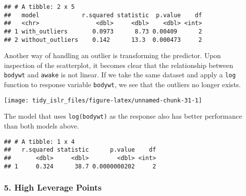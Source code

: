 \documentclass[]{book}
\newenvironment{Shaded}{\begin{snugshade}}{\end{snugshade}}
\newcommand{\DataTypeTok}[1]{\textcolor[rgb]{0.13,0.29,0.53}{#1}}
\newcommand{\KeywordTok}[1]{\textcolor[rgb]{0.13,0.29,0.53}{\textbf{#1}}}
\newcommand{\NormalTok}[1]{#1}
\newcommand{\OperatorTok}[1]{\textcolor[rgb]{0.81,0.36,0.00}{\textbf{#1}}}
\newcommand{\StringTok}[1]{\textcolor[rgb]{0.31,0.60,0.02}{#1}}
\begin{document}
\begin{verbatim}
## # A tibble: 2 x 5
##   model            r.squared statistic  p.value    df
##   <chr>                <dbl>     <dbl>    <dbl> <int>
## 1 with_outliers       0.0973      8.73 0.00409      2
## 2 without_outliers    0.142      13.3  0.000473     2
\end{verbatim}

Another way of handling an outlier is transforming the predictor. Upon inspection of the scatterplot, it becomes clear that the relationship between \texttt{bodywt} and \texttt{awake} is not linear. If we take the same dataset and apply a \texttt{log} function to response variable \texttt{bodywt}, we see that the outliers no longer exists.

\begin{Shaded}
\end{Shaded}

\begin{center}\texttt{[image: tidy\_islr\_files/figure-latex/unnamed-chunk-31-1]} \end{center}

The model that uses \texttt{log(bodywt)} as the response also has better performance than both models above.

\begin{Shaded}
\end{Shaded}

\begin{verbatim}
## # A tibble: 1 x 4
##   r.squared statistic      p.value    df
##       <dbl>     <dbl>        <dbl> <int>
## 1     0.324      38.7 0.0000000202     2
\end{verbatim}

\hypertarget{high-leverage-points}{%
\subsubsection{5. High Leverage Points}\label{high-leverage-points}}
\end{document}
